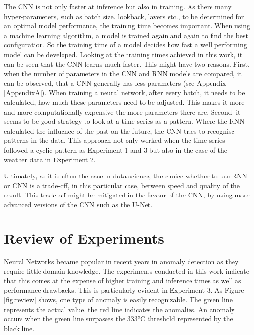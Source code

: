 The CNN is not only faster at inference but also in training. As there many hyper-parameters, such as batch size, lookback, layers etc., to be determined for an optimal model performance, the training time becomes important. When using a machine learning algorithm, a model is trained again and again to find the best configuration. So the training time of a model decides how fast a well performing model can be developed. Looking at the training times achieved in this work, it can be seen that the CNN learns much faster. This might have two reasons. First, when the number of parameters in the CNN and RNN models are compared, it can be observed, that a CNN generally has less parameters (see Appendix \ref{AppendixA}). When training a neural network, after every batch, it needs to be calculated, how much these parameters need to be adjusted. This makes it more and more computationally expensive the more parameters there are. Second, it seems to be good strategy to look at a time series as a pattern. Where the RNN calculated the influence of the past on the future, the CNN tries to recognise patterns in the data. This approach not only worked when the time series followed a cyclic pattern as Experiment 1 and 3 but also in the case of the weather data in Experiment 2.     

Ultimately, as it is often the case in data science, the choice whether to use RNN or CNN is a trade-off, in this particular case, between speed and quality of the result. This trade-off might be mitigated in the favour of the CNN, by using more advanced versions of the CNN such as the U-Net.


\section{Review of Experiments}
Neural Networks became popular in recent years in anomaly detection as they require little domain knowledge. The experiments conducted in this work indicate that this comes at the expense of higher training and inference times as well as performance drawbacks. This is particularly evident in Experiment 3. As Figure \ref{fig:review} shows, one type of anomaly is easily recognizable. The green line represents the actual value, the red line indicates the anomalies. An anomaly occurs when the green line surpasses the 333°C threshold represented by the black line. 

